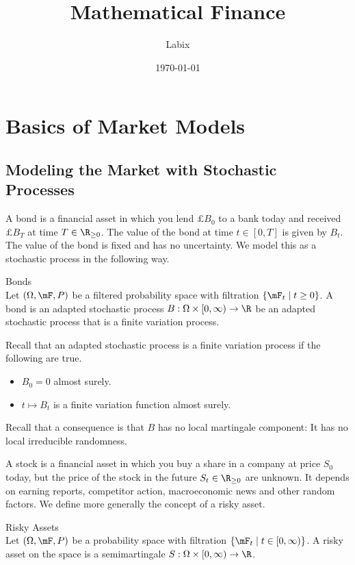 \documentclass[a4paper]{article}
\title{Mathematical Finance}
\author{Labix}
\date{\today}
\begin{document}
\maketitle
\pagebreak
\tableofcontents

\pagebreak
\section{Basics of Market Models}
\subsection{Modeling the Market with Stochastic Processes}
A bond is a financial asset in which you lend $£B_0$ to a bank today and received $£B_T$ at time $T\in\R_{\geq 0}$. The value of the bond at time $t\in[0,T]$ is given by $B_t$. The value of the bond is fixed and has no uncertainty. We model this as a stochastic process in the following way. 

\begin{defn}{Bonds}{}\\
Let $(\Omega,\mF,P)$ be a filtered probability space with filtration $\{\mF_t\;|\;t\geq 0\}$. A bond is an adapted stochastic process $B:\Omega\times[0,\infty)\to\R$ be an adapted stochastic process that is a finite variation process. 
\end{defn}

Recall that an adapted stochastic process is a finite variation process if the following are true. 
\begin{itemize}
\item $B_0=0$ almost surely. 
\item $t\mapsto B_t$ is a finite variation function almost surely. 
\end{itemize}

Recall that a consequence is that $B$ has no local martingale component: It has no local irreducible randomness. 

A stock is a financial asset in which you buy a share in a company at price $S_0$ today, but the price of the stock in the future $S_t\in\R_{\geq 0}$ are unknown. It depends on earning reports, competitor action, macroeconomic news and other random factors. We define more generally the concept of a risky asset. 

\begin{defn}{Risky Assets}{}\\
Let $(\Omega,\mF,P)$ be a probability space with filtration $\{\mF_t\;|\;t\in[0,\infty)\}$. A risky asset on the space is a semimartingale $S:\Omega\times[0,\infty)\to\R$. 
\end{defn}
\end{document}
